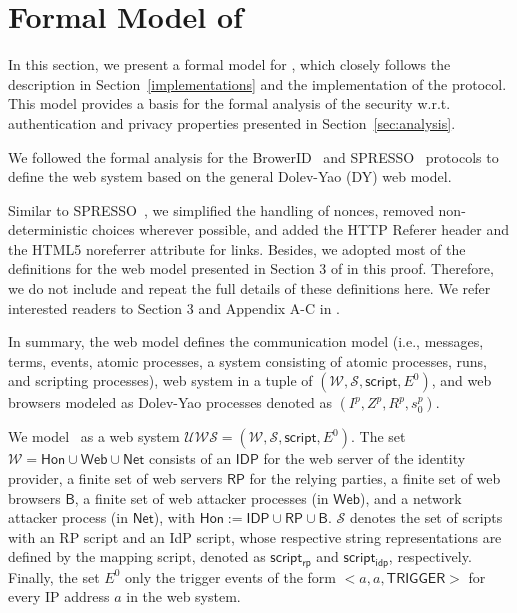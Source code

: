 \appendix

\section{Formal Model of \usso}
\label{appendix-model}

In this section, we present a formal model for \usso, which closely follows the description in Section~\ref{implementations} and the implementation of the protocol. This model provides a basis for the formal analysis of the security w.r.t. authentication and privacy properties presented in Section~\ref{sec:analysis}.

\vspace{1mm}  We followed the formal analysis for the BrowerID~\cite{BrowserID} and SPRESSO~\cite{SPRESSO} protocols to define the web system based on the general Dolev-Yao (DY) web model. 

Similar to SPRESSO~\cite{SPRESSO}, we simplified the handling of nonces, removed non-deterministic choices wherever possible, and added the HTTP Referer header and the HTML5 noreferrer attribute for links. Besides, we adopted most of the definitions for the web model presented in Section 3 of \cite{SPRESSO} in this proof. Therefore, we do not include and repeat the full details of these definitions here. We refer interested readers to Section 3 and Appendix A-C in \cite{SPRESSO}.

In summary, the web model defines the communication model (i.e., messages, terms, events, atomic processes, a system consisting of atomic processes, runs, and scripting processes), web system in a tuple of $(\mathcal{W}, \mathcal{S}, \mathsf{script}, E^0)$, and web browsers modeled as Dolev-Yao processes denoted as $(I^p, Z^p, R^p, s_0^p)$. 

\vspace{1mm}  We model \usso\ as a web system $\mathcal{UWS}=(\mathcal{W}, \mathcal{S}, \mathsf{script}, E^0)$. The set $\mathcal{W} = \mathsf{Hon} \cup \mathsf{Web} \cup \mathsf{Net}$ consists of an $\mathsf{IDP}$ for the web server of the identity provider, a finite set of web servers $\mathsf{RP}$ for the relying parties, 
a finite set of web browsers $\mathsf{B}$, %
a finite set of web attacker processes (in $\mathsf{Web}$), and a network attacker process (in $\mathsf{Net}$), with $\mathsf{Hon}:=\mathsf{IDP}\cup\mathsf{RP}\cup\mathsf{B}$. $\mathcal{S}$ denotes the set of scripts with an RP script and an IdP script, whose respective string representations are defined by the mapping script, denoted as $\mathsf{script_{rp}}$ and $\mathsf{script_{idp}}$, respectively. Finally, the set $E^0$ only the trigger events of the form $<a,a,\mathsf{TRIGGER}>$ for every IP address $a$ in the web system.

